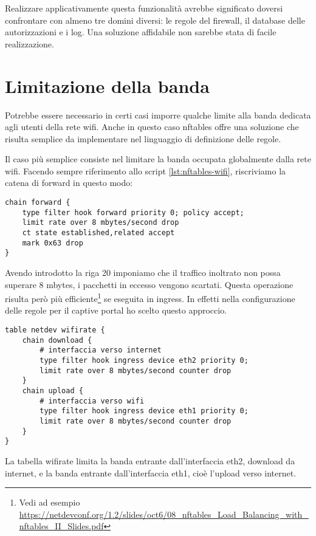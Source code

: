 Realizzare applicativamente questa funzionalit\`a avrebbe significato
doversi confrontare con almeno tre domini diversi: le regole del firewall, il
database delle autorizzazioni e i log. Una soluzione affidabile non sarebbe stata di
facile realizzazione.

\section{Limitazione della banda}

Potrebbe essere necessario in certi casi imporre qualche limite alla banda
dedicata agli utenti della rete wifi. Anche in questo caso nftables offre una
soluzione che risulta semplice da implementare
nel linguaggio di definizione delle regole.

Il caso pi\`u semplice consiste nel limitare la banda occupata globalmente
dalla rete wifi.
Facendo sempre riferimento allo script \ref{lst:nftables-wifi}, riscriviamo
la catena di forward in questo modo:

\begin{lstlisting}[style=customc,firstnumber=18]
chain forward {
    type filter hook forward priority 0; policy accept;
    limit rate over 8 mbytes/second drop
    ct state established,related accept
    mark 0x63 drop
}
\end{lstlisting}
Avendo introdotto la riga 20 imponiamo che il traffico inoltrato non possa
superare 8 mbytes, i pacchetti in eccesso vengono scartati.
Questa operazione risulta per\`o  pi\`u efficiente\footnote{Vedi ad esempio
\url{https://netdevconf.org/1.2/slides/oct6/08\_nftables\_Load\_Balancing\_with\_nftables\_II\_Slides.pdf}}
se eseguita in ingress.
In effetti nella configurazione delle regole per il captive portal ho scelto questo
approccio.
\begin{lstlisting}[style=customc,firstnumber=18]
table netdev wifirate {
    chain download {
        # interfaccia verso internet
        type filter hook ingress device eth2 priority 0;
        limit rate over 8 mbytes/second counter drop
    }
    chain upload {
        # interfaccia verso wifi
        type filter hook ingress device eth1 priority 0;
        limit rate over 8 mbytes/second counter drop
    }
}
\end{lstlisting}
La tabella wifirate limita la banda entrante dall'interfaccia eth2, download da internet,
e la banda entrante dall'interfaccia eth1, cio\`e l'upload verso internet.

